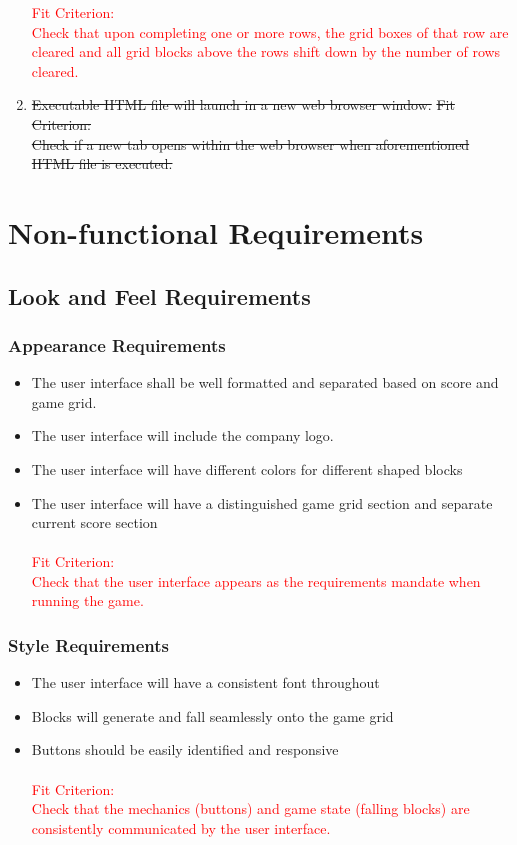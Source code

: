\documentclass[12pt, titlepage]{article}
\begin{document}
\begin{enumerate}
    \textcolor{red}{Fit Criterion:} \\
    \textcolor{red}{Check that upon completing one or more rows, the grid boxes of that row are cleared and all grid blocks above the rows shift down by the number of rows cleared.}
    \item
    \sout{Executable HTML file will launch in a new web browser window.}    \subitem
    \sout{Fit Criterion:} \\
    \sout{Check if a new tab opens within the web browser when aforementioned HTML file is executed.}
\end{enumerate}
    



\section{Non-functional Requirements}

\subsection{Look and Feel Requirements}
\subsubsection{Appearance Requirements}
\begin{itemize}
\item The user interface shall be well formatted and separated based on score and game grid.
\item The user interface will include the company logo.
\item The user interface will have different colors for different shaped blocks
\item The user interface will have a distinguished game grid section and separate current score section
\\
\\
\textcolor{red}{Fit Criterion:} \\
\textcolor{red}{Check that the user interface appears as the requirements mandate when running the game.}
\end{itemize}
\subsubsection{Style Requirements}
\begin{itemize}
    \item The user interface will have a consistent font throughout
    \item Blocks will generate and fall seamlessly onto the game grid
    \item Buttons should be easily identified and responsive 
    \\
    \\
    \textcolor{red}{Fit Criterion:} \\
    \textcolor{red}{Check that the mechanics (buttons) and game state (falling blocks) are consistently communicated by the user interface.}
\end{itemize}
\end{document}
